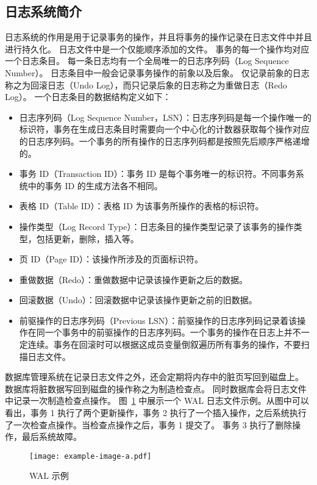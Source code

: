 \subsection{日志系统简介}

日志系统的作用是用于记录事务的操作，并且将事务的操作记录在日志文件中并且进行持久化。
日志文件中是一个仅能顺序添加的文件。
事务的每一个操作均对应一个日志条目。
每一条日志均有一个全局唯一的日志序列码（Log Sequence Number）。
日志条目中一般会记录事务操作的前象以及后象。
仅记录前象的日志称之为回滚日志（Undo Log），而只记录后象的日志称之为重做日志（Redo Log）。
一个日志条目的数据结构定义如下：
\begin{itemize}
    \item 日志序列码（Log Sequence Number，LSN）：日志序列码是每一个操作唯一的标识符，事务在生成日志条目时需要向一个中心化的计数器获取每个操作对应的日志序列码。一个事务的所有操作的日志序列码都是按照先后顺序严格递增的。
    \item 事务 ID（Transaction ID）：事务 ID 是每个事务唯一的标识符。不同事务系统中的事务 ID 的生成方法各不相同。
    \item 表格 ID（Table ID）：表格 ID 为该事务所操作的表格的标识符。
    \item 操作类型（Log Record Type）：日志条目的操作类型记录了该事务的操作类型，包括更新，删除，插入等。
    \item 页 ID（Page ID）：该操作所涉及的页面标识符。
    \item 重做数据（Redo）：重做数据中记录该操作更新之后的数据。
    \item 回滚数据（Undo）：回滚数据中记录该操作更新之前的旧数据。
    \item 前驱操作的日志序列码（Previous LSN）：前驱操作的日志序列码记录着该操作在同一个事务中的前驱操作的日志序列码。一个事务的操作在日志上并不一定连续。事务在回滚时可以根据这成员变量倒叙遍历所有事务的操作，不要扫描日志文件。
\end{itemize}


数据库管理系统在记录日志文件之外，还会定期将内存中的脏页写回到磁盘上。
数据库将脏数据写回到磁盘的操作称之为制造检查点。
同时数据库会将日志文件中记录一次制造检查点操作。
图~\ref{fig:wal} 中展示一个 WAL 日志文件示例。从图中可以看出，事务 1 执行了两个更新操作，事务 2 执行了一个插入操作，之后系统执行了一次检查点操作。当检查点操作之后，事务 1 提交了。
事务 3 执行了删除操作，最后系统故障。


\begin{figure}
    \centering
    \texttt{[image: example-image-a.pdf]}
    \caption{WAL 示例}
    \label{fig:wal}
\end{figure}

